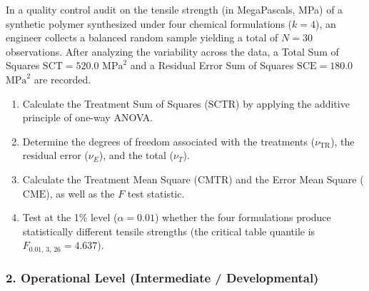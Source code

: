 \begin{problema}
	\label{prob:anova_fund_particion}
	In a quality control audit on the tensile strength (in MegaPascals, MPa) of a synthetic polymer synthesized under four chemical formulations ($k = 4$), an engineer collects a balanced random sample yielding a total of $N = 30$ observations. After analyzing the variability across the data, a Total Sum of Squares $\text{SCT} = 520.0$ $\text{MPa}^2$ and a Residual Error Sum of Squares $\text{SCE} = 180.0$ $\text{MPa}^2$ are recorded.
	\begin{enumerate}
		\item Calculate the Treatment Sum of Squares ($\text{SCTR}$) by applying the additive principle of one-way ANOVA.
		\item Determine the degrees of freedom associated with the treatments ($\nu_{\text{TR}}$), the residual error ($\nu_E$), and the total ($\nu_T$).
		\item Calculate the Treatment Mean Square ($\text{CMTR}$) and the Error Mean Square ($\text{CME}$), as well as the $F$ test statistic.
		\item Test at the 1\% level ($\alpha = 0.01$) whether the four formulations produce statistically different tensile strengths (the critical table quantile is $F_{0.01, \, 3, \, 26} = 4.637$).
	\end{enumerate}
\end{problema}

\subsubsection*{2. Operational Level (Intermediate / Developmental)}

